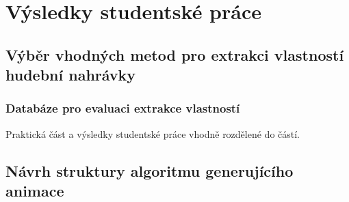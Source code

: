 \chapter{Výsledky studentské práce}



\section{Výběr vhodných metod pro extrakci vlastností hudební nahrávky}

\subsection{Databáze pro evaluaci extrakce vlastností}

Praktická část a výsledky studentské práce vhodně rozdělené do částí.

\section{Návrh struktury algoritmu generujícího animace}